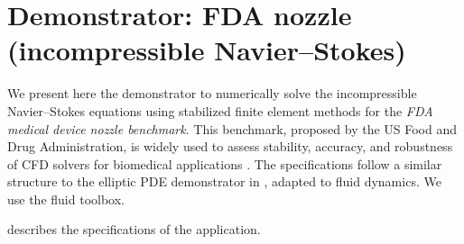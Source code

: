 
\section{Demonstrator: FDA nozzle (incompressible Navier--Stokes)}
\label{sec:app:specs:app-feelpp-discr-2}

We present here the demonstrator to numerically solve the incompressible Navier--Stokes equations using stabilized finite element methods for the \emph{FDA medical device nozzle benchmark}. This benchmark, proposed by the US Food and Drug Administration, is widely used to assess stability, accuracy, and robustness of CFD solvers for biomedical applications \cite{hariharan_multilaboratory_2011,stewart_assessment_2012}. The specifications follow a similar structure to the elliptic PDE demonstrator in , adapted to fluid dynamics. We use the \Feelpp fluid toolbox.

 describes the specifications of the application.

